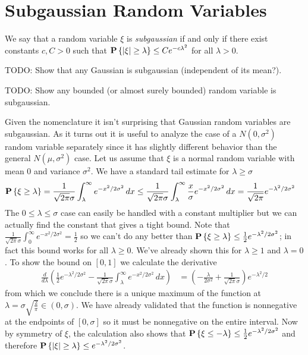 \section{Subgaussian Random Variables}

\begin{defn}
We say that a random variable $\xi$ is \emph{subgaussian} if and only if
there exist constants $c, C > 0$ such that $\textbf{P}\left \{ \left \vert \xi \right \vert
  \geq \lambda \right \} \leq C e^{-c \lambda^2}$ for all $\lambda > 0$.
\end{defn}

TODO: Show that any Gaussian is subgaussian (independent of its mean?).

TODO: Show any bounded (or almost surely bounded) random variable is
subgaussian.

\begin{examp}Given the nomenclature it isn't surprising that Gaussian
  random variables are subgaussian.  As it turns out it is useful to
  analyze the case of a $N(0,\sigma^2)$ random variable separately
  since it has slightly different behavior than the general $N(\mu,
  \sigma^2)$ case.  Let us assume that $\xi$ is a normal random
  variable with mean $0$ and variance $\sigma^2$.  We have a standard tail estimate for $\lambda \geq \sigma$
\begin{align*}
\textbf{P}\left \{\xi \geq \lambda \right \} &= 
\frac{1}{\sqrt{2\pi}\sigma} \int_\lambda^\infty e^{-x^2/2\sigma^2} \, dx \leq 
\frac{1}{\sqrt{2\pi}\sigma} \int_\lambda^\infty \frac{x}{\sigma} e^{-x^2/2\sigma^2} \, dx =
\frac{1}{\sqrt{2\pi}} e^{-\lambda^2/2\sigma^2}
\end{align*}
The $0 \leq \lambda \leq \sigma$ case can easily be handled with a constant
multiplier but we can actually find the constant that gives a tight
bound.  Note that $\frac{1}{\sqrt{2\pi}\sigma} \int_0^\infty e^{-x^2/2\sigma^2} =
\frac{1}{2}$ so we can't do any better than $\textbf{P}\left \{\xi \geq
  \lambda \right \} \leq \frac{1}{2} e^{-\lambda^2/2\sigma^2}$; in fact this bound
works for all $\lambda \geq 0$.  We've already shown this for $\lambda
\geq 1$ and $\lambda=0$.  To show the bound on $[0,1]$ we calculate
the derivative 
\begin{align*}
\frac{d}{d\lambda} \left( \frac{1}{2} e^{-\lambda^2/2\sigma^2} -
  \frac{1}{\sqrt{2\pi}\sigma} \int_\lambda^\infty e^{-x^2/2\sigma^2} \, dx \right)
&=\left( -\frac{\lambda}{2\sigma^2} + \frac{1}{\sqrt{2\pi}\sigma}\right) e^{-\lambda^2/2}
\end{align*}
from which we conclude there is a unique maximum of the function at
$\lambda=\sigma \sqrt{\frac{2}{\pi}} \in (0,\sigma)$.  We have already validated
that the function is nonnegative at the endpoints of $[0,\sigma]$ so it must
be nonnegative on the entire interval.  Now by symmetry of $\xi$, the
calculation also shows that $\textbf{P}\left \{\xi \leq -\lambda \right \} \leq
\frac{1}{2}e^{-\lambda^2/2\sigma^2}$ and therefore $\textbf{P}\left \{\left \vert \xi \right \vert
  \geq \lambda \right \} \leq e^{-\lambda^2/2\sigma^2}$.


\end{examp}
